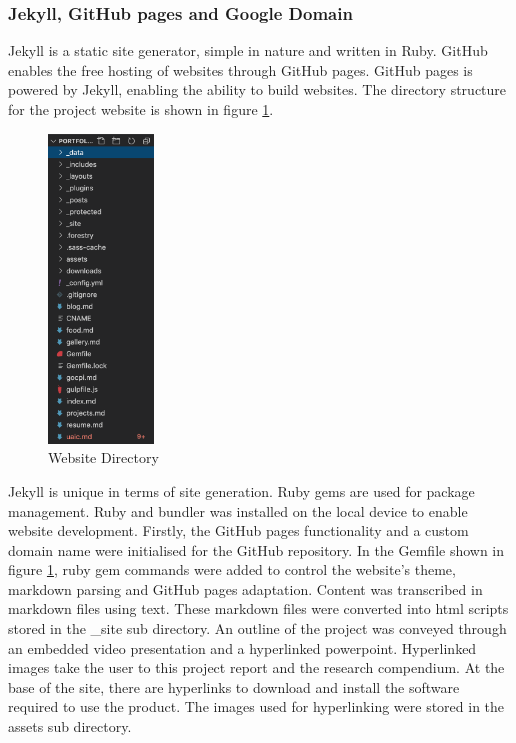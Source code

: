 \documentclass[12pt]{article}
\begin{document}
\subsubsection{Jekyll, GitHub pages and Google Domain}
Jekyll is a static site generator, simple in nature and written in Ruby.
GitHub enables the free hosting of websites through GitHub pages.
GitHub pages is powered by Jekyll, enabling the ability to build websites.
The directory structure for the project website is shown in figure \ref{fig:WD}.
\begin{figure}
	\centering
	\includegraphics[width = 0.25\textwidth]{website-dir.png}
	\caption{Website Directory}
	\label{fig:WD}
\end{figure}
Jekyll is unique in terms of site generation. Ruby gems are used for package management. 
Ruby and bundler was installed on the local device to enable website development.
Firstly, the GitHub pages functionality and a custom domain name were initialised for the GitHub repository.
In the Gemfile shown in figure \ref{fig:WD}, ruby gem commands were added to control the website's theme, markdown parsing and GitHub pages adaptation.
Content was transcribed in markdown files using text.
These markdown files were converted into html scripts stored in the \_site sub directory. 
An outline of the project was conveyed through an embedded video presentation and a hyperlinked powerpoint.
Hyperlinked images take the user to this project report and the research compendium.
At the base of the site, there are hyperlinks to download and install the software required to use the product.
The images used for hyperlinking were stored in the assets sub directory.
\end{document}
